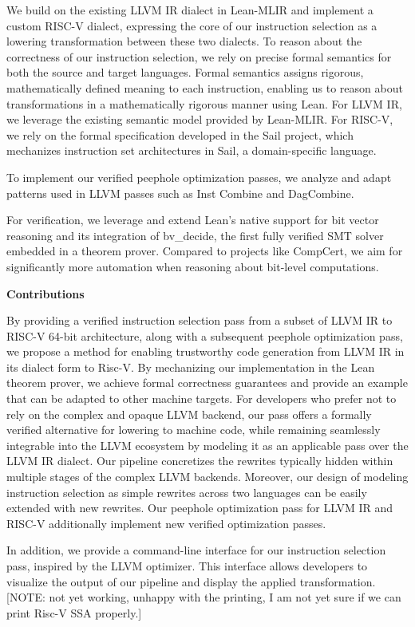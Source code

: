 We build on the existing LLVM IR dialect in Lean-MLIR and implement a custom RISC-V dialect, expressing the core of our instruction selection as a lowering transformation between these two dialects. To reason about the correctness of our instruction selection, we rely on precise formal semantics for both the source and target languages. Formal semantics assigns rigorous, mathematically defined meaning to each instruction, enabling us to reason about transformations in a mathematically rigorous manner using Lean. For LLVM IR, we leverage the existing semantic model provided by Lean-MLIR. For RISC-V, we rely on the formal specification developed in the Sail project, which mechanizes instruction set architectures in Sail, a domain-specific language. 

To implement our verified peephole optimization passes, we analyze and adapt patterns used in LLVM passes such as Inst Combine and DagCombine.

For verification, we leverage and extend Lean’s native support for bit vector reasoning and its integration of bv\_decide, the first fully verified SMT solver embedded in a theorem prover. Compared to projects like CompCert, we aim for significantly more automation when reasoning about bit-level computations. 

\textbf{Contributions }

By providing a verified instruction selection pass from a subset of LLVM IR to RISC-V 64-bit architecture, along with a subsequent peephole optimization pass, we propose a method for enabling trustworthy code generation from LLVM IR in its dialect form to Risc-V. By mechanizing our implementation in the Lean theorem prover, we achieve formal correctness guarantees and provide an example that can be adapted to other machine targets. For developers who prefer not to rely on the complex and opaque LLVM backend, our pass offers a formally verified alternative for lowering to machine code, while remaining seamlessly integrable into the LLVM ecosystem by modeling it as an applicable pass over the LLVM IR dialect. Our pipeline concretizes the rewrites typically hidden within multiple stages of the complex LLVM backends. Moreover, our design of modeling instruction selection as simple rewrites across two languages can be easily extended with new rewrites.
Our peephole optimization pass for LLVM IR and RISC-V additionally implement new verified optimization passes.

In addition, we provide a command-line interface for our instruction selection pass, inspired by the LLVM optimizer. This interface allows developers to visualize the output of our pipeline and display the applied transformation.
[NOTE: not yet working, unhappy with the printing, I am not yet sure if we can print Risc-V SSA properly.]

